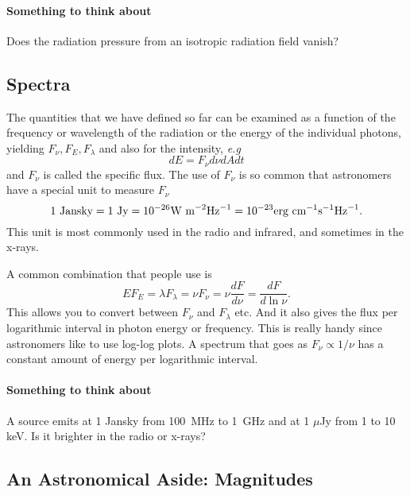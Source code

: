 \paragraph{Something to think about}  Does the radiation pressure 
from an isotropic radiation field vanish?

\subsection{Spectra}
\label{sec:spectra}

The quantities that we have defined so far can be examined as a
function of the frequency or wavelength of the radiation or the energy
of the individual photons, yielding $F_\nu, F_E, F_\lambda$ and 
also for the intensity, {\em e.g}
\begin{equation}
d E = F_{\nu} d \nu d\!A d t
\label{eq:8}
\end{equation}
and $F_\nu$ is called the specific flux.
The use of $F_{\nu}$ is so common that astronomers have a special 
unit to measure $F_\nu$
\begin{equation}
1~\hbox{\rm Jansky} = 1~\hbox{\rm Jy} = 10^{-26} \hbox{W m}^{-2}
\hbox{Hz}^{-1} = 10^{-23} \hbox{\rm erg cm}^{-1} \hbox{s}^{-1} \hbox{Hz}^{-1}.
\label{eq:9}
\end{equation}
This unit is most commonly used in the radio and infrared, and sometimes
in the x-rays.

A common combination that people use is 
\begin{equation}
E F_E = \lambda F_\lambda = \nu F_\nu  = \nu \frac{d F}{d \nu} =
\frac{d F}{d \ln \nu}.
\label{eq:10}
\end{equation}
This allows you to convert between $F_\nu$ and $F_\lambda$ etc.  And
it also gives the flux per logarithmic interval in photon energy or
frequency.  This is really handy since astronomers like to use log-log
plots.   A spectrum that goes as $F_\nu \propto 1/\nu$ has a constant 
amount of energy per logarithmic interval.

\paragraph{Something to think about}
A source emits at 1 Jansky from 100~MHz to 1~GHz and at 1 $\mu$Jy from
1 to 10 keV.  Is it brighter in the radio or x-rays?

\subsection{An Astronomical Aside: Magnitudes}
\label{sec:an-astr-asid}

